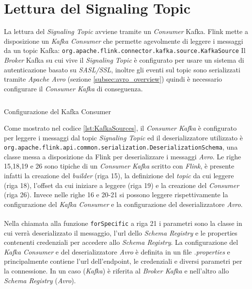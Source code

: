 \section{Lettura del Signaling Topic}
\label{sec:LetturaDelSignalingTopic}
La lettura del \textit{Signaling Topic} avviene tramite un \textit{Consumer} Kafka.
Flink mette a disposizione un \textit{Kafka Consumer} 
che permette agevolmente di leggere i messaggi da un topic Kafka: \texttt{org.apache.flink.connector.kafka.source.KafkaSource}
Il \textit{Broker} Kafka su cui vive il \textit{Signaling Topic} è configurato per usare un sistema di autenticazione basato su \textit{SASL/SSL},
inoltre gli eventi sul topic sono serializzati tramite \textit{Apache Avro} (sezione \ref{subsec:avro_overview}) quindi è necessario configurare il \textit{Consumer Kafka} di conseguenza.
\begin{code}
    \inputminted[linenos]{java}{listings/EventsExport/KafkaSources.java}
    \caption{Configurazione del Kafka Consumer}
    \label{lst:KafkaSources}
\end{code}
Come mostrato nel codice \ref{lst:KafkaSources}, il \textit{Consumer Kafka} è configurato per leggere i messaggi dal topic \textit{Signaling Topic} 
ed il deserializzatore utilizzato è\\ \texttt{org.apache.flink.api.common.serialization.DeserializationSchema},
una classe messa a disposizione da Flink per deserializzare i messaggi \textit{Avro}.
Le righe 15,18,19 e 26 sono tipiche di un \textit{Consumer Kafka} scritto con \textit{Flink}, è presente infatti la creazione del \textit{builder} (riga 15),
la definizione del \textit{topic} da cui leggere (riga 18), l'offset da cui iniziare a leggere (riga 19) e  la creazione del \textit{Consumer} (riga 26).
Invece nelle righe 16 e 20-21 si possono leggere rispettivamente la configurazione del \textit{Kafka Consumer} e la configurazione del deserializzatore \textit{Avro}.\\\\
Nella chiamata alla funzione \texttt{forSpecific} a riga 21 i parametri sono la classe in cui verrà deserializzato il messaggio, l'url dello \textit{Schema Registry}
e le properties contenenti credenziali per accedere allo \textit{Schema Registry}. 
La configurazione del \textit{Kafka Consumer} e del deserializzatore \textit{Avro} è definita in un file \textit{.properties} e principalmente contiene
l'url dell'endpoint, le credenziali e diversi parametri per la connessione.
In un caso (\textit{Kafka}) è riferita al \textit{Broker Kafka} e nell'altro allo \textit{Schema Registry} (\textit{Avro}).

